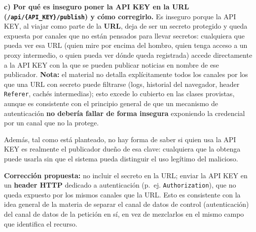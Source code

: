 \textbf{c) Por qué es inseguro poner la API KEY en la URL (\texttt{/api/\{API\_KEY\}/publish}) y cómo corregirlo.}
Es inseguro porque la API KEY, al viajar como parte de la \textbf{URL}, deja de ser un
secreto protegido y queda expuesta por canales que no están pensados para llevar
secretos: cualquiera que pueda ver esa URL (quien mire por encima del hombro, quien tenga
acceso a un proxy intermedio, o quien pueda ver dónde queda registrada) accede
directamente a la API KEY con la que se pueden publicar noticias en nombre de ese
publicador. \textbf{Nota:} el material no detalla explícitamente todos los canales por
los que una URL con secreto puede filtrarse (logs, historial del navegador, header
\texttt{Referer}, cachés intermedias); esto excede lo cubierto en las clases provistas,
aunque es consistente con el principio general de que un mecanismo de autenticación
\textbf{no debería fallar de forma insegura} exponiendo la credencial por un canal que no
la protege.

Además, tal como está planteado, no hay forma de saber si quien usa la API KEY es
realmente el publicador dueño de esa clave: cualquiera que la obtenga puede usarla sin
que el sistema pueda distinguir el uso legítimo del malicioso.

\textbf{Corrección propuesta:} no incluir el secreto en la URL; enviar la API KEY en un
\textbf{header HTTP} dedicado a autenticación (p.\ ej. \texttt{Authorization}), que no
queda expuesto por los mismos canales que la URL. Esto es consistente con la idea general
de la materia de separar el canal de datos de control (autenticación) del canal de datos
de la petición en sí, en vez de mezclarlos en el mismo campo que identifica el recurso.
